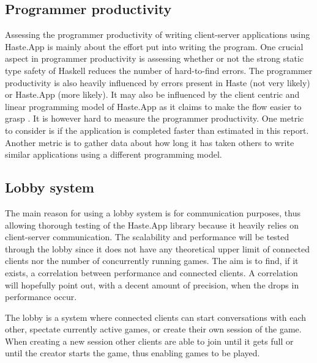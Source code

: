\documentclass[a4paper]{article}
\begin{document}
\subsection{Programmer productivity}
Assessing the programmer productivity of writing client-server applications using Haste.App
is mainly about the effort put into writing the program. One crucial aspect in programmer productivity is assessing whether or not the strong static type safety of Haskell reduces the number of hard-to-find errors. The programmer productivity is also heavily influenced by errors present in Haste (not very likely) or Haste.App (more likely). It may also be influenced by the client centric and linear programming model of Haste.App as it claims to make the flow easier to grasp \cite{ekblad2015seamless}. It is however hard to measure the programmer productivity. One metric to consider is if the application is completed faster than estimated in this report. Another metric is to gather data about how long it has taken others to write similar applications using a different programming model. 

\subsection{Lobby system}
The main reason for using a lobby system is for communication purposes, thus allowing thorough testing of the Haste.App library because it heavily relies on client-server communication. The scalability and performance will be tested through the lobby since it does not have any theoretical upper limit of connected clients nor the number of concurrently running games. The aim is to find, if it exists, a correlation between performance and connected clients. A correlation will hopefully point out, with a decent amount of precision, when the drops in performance occur.

The lobby is a system where connected clients can start conversations with each other, spectate currently active games, or create their own session of the game. When creating a new session other clients are able to join until it gets full or until the creator starts the game, thus enabling games to be played. 
\end{document}
